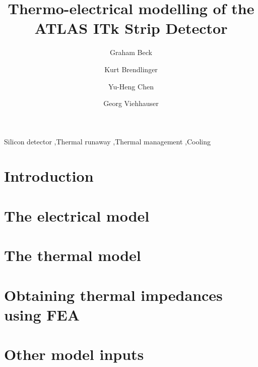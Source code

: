 \documentclass[preprint]{elsarticle/elsarticle}
\begin{document}
\begin{frontmatter}

\title{Thermo-electrical modelling of the ATLAS ITk Strip Detector}
\author[1]{Graham Beck}      %
\author[2]{Kurt Brendlinger} %
\author[2]{Yu-Heng Chen}     %
\author[3]{Georg Viehhauser} %

\address[1]{Queen Mary University of London, London, UK}
\address[2]{Deutsches Elektronen-Synchrotron DESY, Notkestra{\ss}e 85, 22607 Hamburg}
\address[3]{Oxford University, Oxford, England, UK}

\begin{abstract}

\end{abstract}

\begin{keyword}
Silicon detector \sep Thermal runaway \sep Thermal management \sep Cooling
\end{keyword}

\end{frontmatter}

\section{Introduction}


\section{The electrical model}


\section{The thermal model}


\section{Obtaining thermal impedances using FEA}


\section{Other model inputs}

\end{document}
